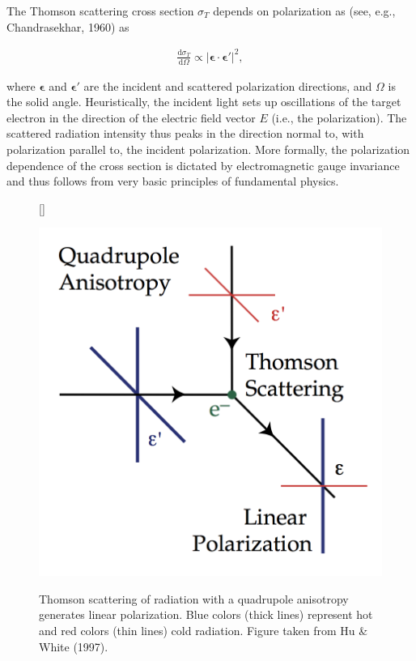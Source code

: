\documentclass[a4paper,11pt]{article}
\begin{document}
{\noindent}The Thomson scattering cross section $\sigma_T$ depends on polarization as (see, e.g., Chandrasekhar, 1960) as 

\begin{align*}
    \frac{\mathrm{d}\sigma_T}{\mathrm{d}\Omega} \propto \lvert \bm{\epsilon}\cdot\bm{\epsilon}' \rvert^2,
\end{align*}

{\noindent}where $\bm{\epsilon}$ and $\bm{\epsilon}'$ are the incident and scattered polarization directions, and $\Omega$ is the solid angle. Heuristically, the incident light sets up oscillations of the target electron in the direction of the electric field vector $E$ (i.e., the polarization). The scattered radiation intensity thus peaks in the direction normal to, with polarization parallel to, the incident polarization. More formally, the polarization dependence of the cross section is dictated by electromagnetic gauge invariance and thus follows from very basic principles of fundamental physics.

\begin{figure}[h]
    [\FBwidth]
    {\caption{\footnotesize{Thomson scattering of radiation with a quadrupole anisotropy generates linear polarization. Blue colors (thick lines) represent hot and red colors (thin lines) cold radiation. Figure taken from Hu \& White (1997).}}
    \label{fig:Thomsonscattering}}
    {\includegraphics[width=12cm]{figures/ThomsonScattering.png}}
\end{figure}
\end{document}
